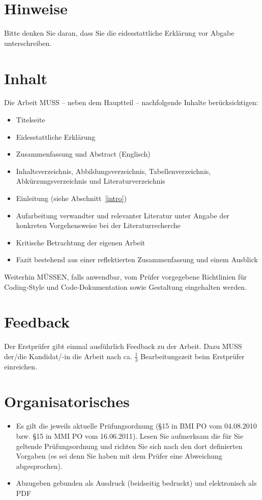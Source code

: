\section{Hinweise}

Bitte denken Sie daran, dass Sie die eidesstattliche Erklärung vor Abgabe unterschreiben.

\section{Inhalt}

Die Arbeit MUSS -- neben dem Hauptteil -- nachfolgende Inhalte berücksichtigen:

\begin{itemize}
  \item Titelseite
  \item Eidesstattliche Erklärung
  \item Zusammenfassung und Abstract (Englisch)
  \item Inhaltsverzeichnis, Abbildungsverzeichnis, Tabellenverzeichnis, Abkürzungs\-ver\-zeichnis und Literaturverzeichnis
  \item Einleitung (siehe Abschnitt~\ref{intro})
  \item Aufarbeitung verwandter und relevanter Literatur unter Angabe der konkreten
  Vorgehensweise bei der Literaturrecherche
  \item Kritische Betrachtung der eigenen Arbeit
  \item Fazit bestehend aus einer reflektierten Zusammenfassung und einem Ausblick
\end{itemize}

Weiterhin MÜSSEN, falls anwendbar, vom Prüfer vorgegebene Richtlinien für Coding-Style
und Code-Dokumentation sowie Gestaltung eingehalten werden.

\section{Feedback}
Der Erstprüfer gibt einmal ausführlich Feedback zu der Arbeit. Dazu MUSS der/die Kan\-di\-dat/-in
die Arbeit nach ca. $\frac{1}{3}$ Bearbeitungszeit beim Erstprüfer einreichen.

\section{Organisatorisches}

\begin{itemize}
 \item Es gilt die jeweils aktuelle Pr\"ufungsordnung (\S 15 in BMI PO vom 04.08.2010 bzw. \S 15 in MMI PO vom 16.06.2011).
 Lesen Sie aufmerksam die für Sie geltende Prüfungsordnung und richten Sie sich nach den dort
 definierten Vorgaben (es sei denn Sie haben mit dem Prüfer eine Abweichung abgesprochen).
 \item Abzugeben gebunden als Ausdruck (beidseitig bedruckt) und elektronisch als PDF
\end{itemize}

